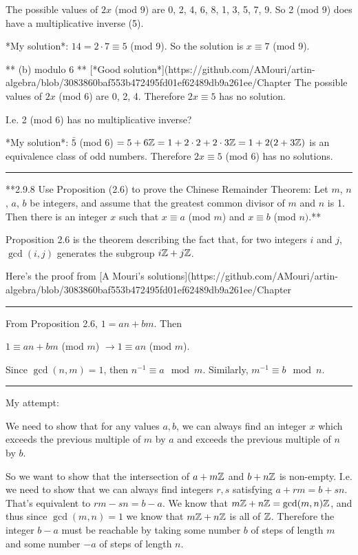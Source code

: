 The possible values of $2x$ (mod 9) are 0, 2, 4, 6, 8, 1, 3, 5, 7, 9. So 2 (mod
9) does have a multiplicative inverse (5).


*My solution*: $14 = 2 \cdot 7 \equiv 5$ (mod 9). So the solution is $x \equiv 7$ (mod 9).

** (b) modulo 6 **
[*Good solution*](https://github.com/AMouri/artin-algebra/blob/3083860baf553b472495fd01ef62489db9a261ee/Chapter%
The possible values of $2x$ (mod 6) are 0, 2, 4. Therefore $2x \equiv 5$ has no
solution.

I.e. 2 (mod 6) has no multiplicative inverse?

*My solution*: $\bar 5$ (mod 6) $= 5 + 6\mathbb{Z} = 1 + 2\cdot2 + 2\cdot3\mathbb{Z} = 1 + 2(2 + 3\mathbb{Z})$ is an
equivalence class of odd numbers. Therefore $2x \equiv 5$ (mod 6) has no
solutions.



\hrule

**2.9.8 Use Proposition (2.6) to prove the Chinese Remainder Theorem: Let $m$,
$n$, $a$, $b$ be integers, and assume that the greatest common divisor of $m$
and $n$ is 1. Then there is an integer $x$ such that $x \equiv a$ (mod $m$)
and $x \equiv b$ (mod $n)$.**

Proposition 2.6 is the theorem describing the fact that, for two integers $i$
and $j$, $\gcd(i, j)$ generates the subgroup $i\mathbb{Z} + j\mathbb{Z}$.

Here's the proof from [A Mouri's solutions](https://github.com/AMouri/artin-algebra/blob/3083860baf553b472495fd01ef62489db9a261ee/Chapter%

\hrule

From Proposition 2.6, $1 = an + bm$. Then

$1 \equiv an + bm$ (mod $m$) $\rightarrow 1 \equiv an$ (mod $m$).

Since $\gcd(n, m) = 1$, then $n^{-1} \equiv a \mod m$. Similarly, $m^{-1}
\equiv b \mod n$.

\hrule
My attempt:

We need to show that for any values $a,b$, we can always find an integer $x$
which exceeds the previous multiple of $m$ by $a$ and exceeds the previous
multiple of $n$ by $b$.

So we want to show that the intersection of $a + m\mathbb{Z}$ and $b + n\mathbb{Z}$ is
non-empty. I.e. we need to show that we can always find integers $r, s$
satisfying $a + rm = b +sn$. That's equivalent to $rm - sn = b - a$. We know
that $m\mathbb{Z} + n\mathbb{Z} = \gcd(m, n)\mathbb{Z}$, and thus since $\gcd(m, n) = 1$ we know that
$m\mathbb{Z} + n\mathbb{Z}$ is all of $\mathbb{Z}$. Therefore the integer $b - a$ must be reachable by
taking some number $b$ of steps of length $m$ and some number $-a$ of steps of
length $n$.

